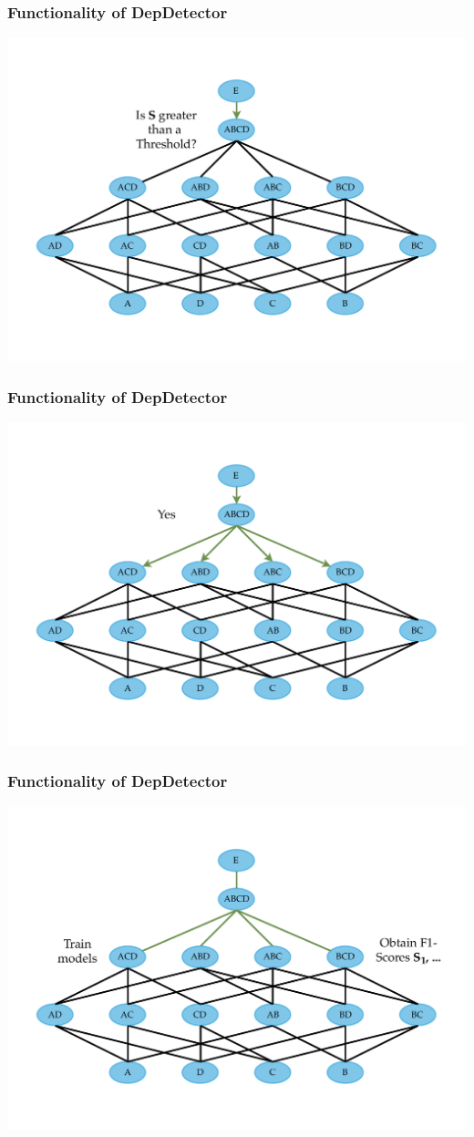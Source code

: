 \documentclass{beamer}
\begin{document}
\begin{frame}
    \frametitle{Functionality of DepDetector}
    \includegraphics[width=.95\textwidth]{min-dep-step-2.pdf}
\end{frame}

\begin{frame}
    \frametitle{Functionality of DepDetector}
    \includegraphics[width=.95\textwidth]{min-dep-step-3.pdf}
\end{frame}

\begin{frame}
    \frametitle{Functionality of DepDetector}
    \includegraphics[width=.95\textwidth]{min-dep-step-4.pdf}
\end{frame}
\end{document}

